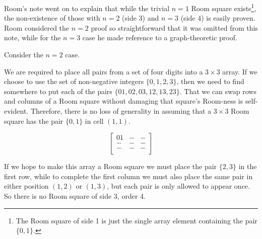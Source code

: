 Room’s note went on to explain that while the trivial $n = 1$ Room square exists\footnote{The Room square of side 1 is just the single array element containing the pair $\{0, 1\}$.},
the non-existence of those with $n = 2$ (side 3) and $n = 3$ (side 4) is easily proven.
Room considered the $n = 2$ proof so straightforward that it was omitted from this note, while for the $n = 3$ case he made reference to a graph-theoretic proof.

\begin{example}
Consider the $n = 2$ case.

We are required to place all pairs from a set of four digits into a $3 \times 3$ array.
If we choose to use the set of non-negative integers
$\{0, 1, 2, 3\}$,
then we need to find somewhere to put each of the pairs
$\{01, 02, 03, 12, 13, 23\}$.
That we can swap rows and columns of a Room square without damaging that square’s Room-ness is self-evident.
Therefore, there is no loss of generality in assuming that a $3 \times 3$ Room square has the pair $\{0, 1\}$ in cell $(1, 1)$.

\begin{equation}
  \begin{bmatrix}
    01 &  - & - \\
    -   & - & - \\
    -   & - & - \\
  \end{bmatrix}
\end{equation}

If we hope to make this array a Room square we must place the pair $\{2, 3\}$ in the first row, while to complete the first column we must also place the same pair in either position $(1, 2)$ or $(1, 3)$, but each pair is only allowed to appear once. So there is no Room square of side 3, order 4.
\label{eg:order3}
\end{example}

